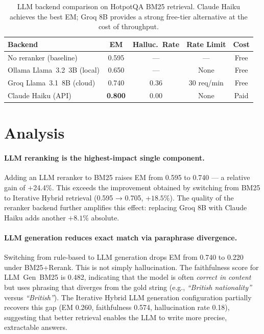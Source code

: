 \documentclass{article}
\begin{document}
\begin{table}[h]
  \caption{LLM backend comparison on HotpotQA BM25 retrieval.
  Claude Haiku achieves the best EM; Groq 8B provides a strong
  free-tier alternative at the cost of throughput.}
  \label{tab:backends}
  \centering
  \small
  \begin{tabular}{lcccc}
    \toprule
    Backend & EM & Halluc.\ Rate & Rate Limit & Cost \\
    \midrule
    No reranker (baseline)     & 0.595 & —    & —         & Free \\
    Ollama Llama~3.2~3B (local)& 0.650 & —    & None      & Free \\
    Groq Llama~3.1~8B (cloud)  & 0.740 & 0.36 & 30 req/min & Free \\
    Claude Haiku (API)          & \textbf{0.800} & 0.00 & None & Paid \\
    \bottomrule
  \end{tabular}
\end{table}

\section{Analysis}
\label{sec:analysis}

\paragraph{LLM reranking is the highest-impact single component.}
Adding an LLM reranker to BM25 raises EM from 0.595 to 0.740 — a
relative gain of $+$24.4\%.  This exceeds the improvement obtained
by switching from BM25 to Iterative Hybrid retrieval (0.595 → 0.705,
+$18.5\%$).  The quality of the reranker backend further amplifies
this effect: replacing Groq 8B with Claude Haiku adds another
$+8.1\%$ absolute.

\paragraph{LLM generation reduces exact match via paraphrase divergence.}
Switching from rule-based to LLM generation drops EM from 0.740 to
0.220 under BM25+Rerank.  This is not simply hallucination.  The
faithfulness score for LLM~Gen~BM25 is 0.482, indicating that the
model is often \emph{correct in content} but uses phrasing that
diverges from the gold string (e.g., \emph{``British nationality''}
versus \emph{``British''}).  The Iterative Hybrid LLM generation
configuration partially recovers this gap (EM 0.260, faithfulness
0.574, hallucination rate 0.18), suggesting that better retrieval
enables the LLM to write more precise, extractable answers.
\end{document}
